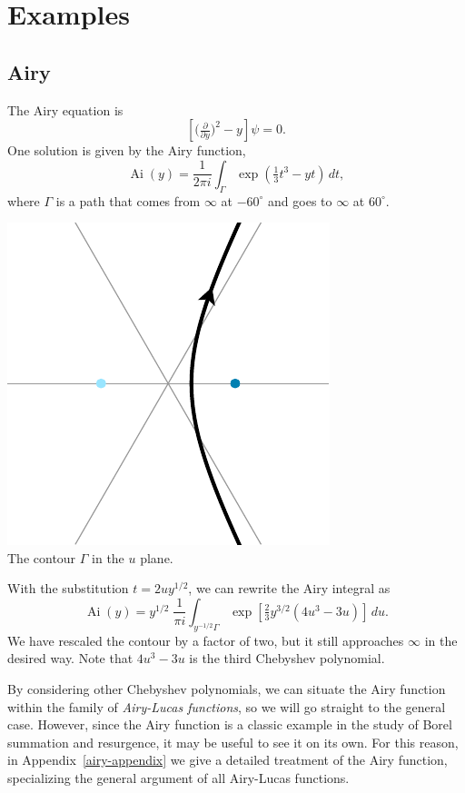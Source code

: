 \documentclass{article}
\theoremstyle{definition}
\DeclareMathOperator{\Ai}{Ai}
\begin{document}
\section{Examples}\label{sec:examples}

\subsection{Airy}

The Airy equation is
\begin{equation}\label{eqn:airy}
\left[\big(\tfrac{\partial}{\partial y}\big)^2 - y\right] \psi = 0.
\end{equation}
One solution is given by the Airy function,
\[ \Ai(y) = \frac{1}{2\pi i} \int_{\Gamma} \exp\left(\tfrac{1}{3}t^3 - yt\right)\,dt, \]
where $\Gamma$ is a path that comes from $\infty$ at $-60^\circ$ and goes to $\infty$ at $60^\circ$.
\begin{center}
\includegraphics{figures/u_contour_3.pdf} \\[1em]
{\small The contour $\Gamma$ in the $u$ plane.}
\end{center}
With the substitution $t = 2uy^{1/2}$, we can rewrite the Airy integral as
\[ \Ai(y) = y^{1/2}\;\frac{1}{\pi i} \int_{y^{-1/2} \Gamma} \exp\left[\tfrac{2}{3}y^{3/2} \left(4u^3 - 3u\right)\right]\,du. \]
We have rescaled the contour by a factor of two, but it still approaches $\infty$ in the desired way. Note that $4u^3 - 3u$ is the third Chebyshev polynomial.

By considering other Chebyshev polynomials, we can situate the Airy function within the family of {\em Airy-Lucas functions}, so we will go straight to the general case. However, since the Airy function is a classic example in the study of Borel summation and resurgence, it may be useful to see it on its own. For this reason, in Appendix~\ref{airy-appendix} we give a detailed treatment of the Airy function, specializing the general argument of all Airy-Lucas functions.
\end{document}
